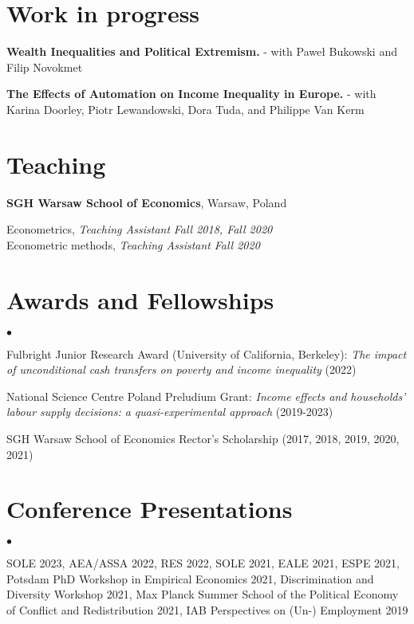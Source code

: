 \documentclass[margin,line]{res}
\newenvironment{list2}{
  \begin{list}{$\bullet$}{%
      \setlength{\itemsep}{0in}
      \setlength{\parsep}{0in} \setlength{\parskip}{0in}
      \setlength{\topsep}{0in} \setlength{\partopsep}{0in} 
      \setlength{\leftmargin}{0.2in}}}{\end{list}}
\begin{document}
\begin{resume}
\vspace*{.05in} 

\section{\sc Work in progress}

\textbf{Wealth Inequalities and Political Extremism.} - with Paweł Bukowski and Filip Novokmet

\textbf{The Effects of Automation on Income Inequality in Europe.} - with Karina Doorley, Piotr Lewandowski, Dora Tuda, and Philippe Van Kerm 
\vspace*{.05in} 

\section{\sc Teaching}
{\bf SGH Warsaw School of Economics}, Warsaw, Poland

\vspace{-.3cm}
Econometrics, \textit{Teaching Assistant} \hfill \textit{Fall 2018, Fall 2020}\\
Econometric methods, \textit{Teaching Assistant} \hfill \textit{Fall 2020}\\

\vspace*{.05in}  
\section{\sc Awards and Fellowships} 
\begin{list2}
\item Fulbright Junior Research Award (University of California, Berkeley): \textit{The impact of unconditional cash transfers on poverty and income inequality} (2022)
\item National Science Centre Poland Preludium Grant: \textit{Income effects and households' labour supply decisions: a quasi-experimental approach} (2019-2023)
\item SGH Warsaw School of Economics Rector's Scholarship (2017, 2018, 2019, 2020, 2021)
\end{list2}
\vspace*{.05in} 
\section{\sc Conference Presentations} 
\begin{list2}
	\item SOLE 2023, AEA/ASSA 2022, RES 2022, SOLE 2021, EALE 2021, ESPE 2021, Potsdam PhD Workshop in Empirical Economics 2021, Discrimination and Diversity Workshop 2021, Max Planck Summer School of the Political Economy of Conflict and Redistribution 2021, IAB Perspectives on (Un-) Employment 2019 
\end{list2}
\vspace*{.05in} 

\end{resume}
\end{document}
